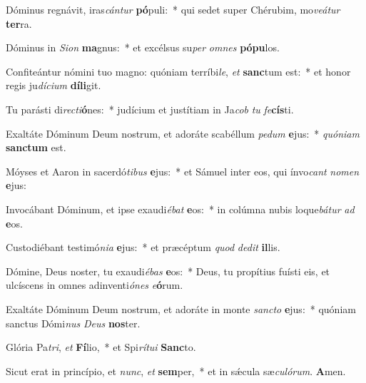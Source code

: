 \item Dóminus regnávit, iras\textit{cán}\textit{tur} \textbf{pó}puli:~* qui sedet super Chérubim, mo\textit{ve}\textit{á}\textit{tur} \textbf{ter}ra.
\item Dóminus in \textit{Si}\textit{on} \textbf{ma}gnus:~* et excélsus su\textit{per} \textit{om}\textit{nes} \textbf{pó}\textbf{pu}los.
\item Confiteántur nómini tuo magno: quóniam terríbi\textit{le}, \textit{et} \textbf{sanc}tum est:~* et honor regis ju\textit{dí}\textit{ci}\textit{um} \textbf{dí}\textbf{li}git.
\item Tu parásti di\textit{rec}\textit{ti}\textbf{ó}nes:~* judícium et justítiam in Ja\textit{cob} \textit{tu} \textit{fe}\textbf{cís}ti.
\item Exaltáte Dóminum Deum nostrum, et adoráte scabéllum \textit{pe}\textit{dum} \textbf{e}jus:~* \textit{quón}\textit{i}\textit{am} \textbf{sanc}\textbf{tum} est.
\item Móyses et Aaron in sacerdó\textit{ti}\textit{bus} \textbf{e}jus:~* et Sámuel inter eos, qui ínvo\textit{cant} \textit{no}\textit{men} \textbf{e}jus:
\item Invocábant Dóminum, et ipse exaudi\textit{é}\textit{bat} \textbf{e}os:~* in colúmna nubis loque\textit{bá}\textit{tur} \textit{ad} \textbf{e}os.
\item Custodiébant testimó\textit{ni}\textit{a} \textbf{e}jus:~* et præcéptum \textit{quod} \textit{de}\textit{dit} \textbf{il}lis.
\item Dómine, Deus noster, tu exaudi\textit{é}\textit{bas} \textbf{e}os:~* Deus, tu propítius fuísti eis, et ulcíscens in omnes adinventi\textit{ó}\textit{nes} \textit{e}\textbf{ó}rum.
\item Exaltáte Dóminum Deum nostrum, et adoráte in monte \textit{sanc}\textit{to} \textbf{e}jus:~* quóniam sanctus Dómi\textit{nus} \textit{De}\textit{us} \textbf{nos}ter.
\item Glória Pa\textit{tri}, \textit{et} \textbf{Fí}lio,~* et Spi\textit{rí}\textit{tu}\textit{i} \textbf{Sanc}to.
\item Sicut erat in princípio, et \textit{nunc}, \textit{et} \textbf{sem}per,~* et in sǽcula sæ\textit{cu}\textit{ló}\textit{rum}. \textbf{A}men.
